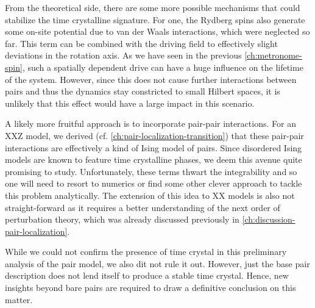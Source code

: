 From the theoretical side, there are some more possible mechanisms that could stabilize the time crystalline signature. For one, the Rydberg spins also generate some on-site potential due to van der Waals interactions, which were neglected so far. This term can be combined with the driving field to effectively slight deviations in the rotation axis. As we have seen in the previous \autoref{ch:metronome-spin}, such a spatially dependent drive can have a huge influence on the lifetime of the system. However, since this does not cause further interactions between pairs and thus the dynamics stay constricted to small Hilbert spaces, it is unlikely that this effect would have a large impact in this scenario.

A likely more fruitful approach is to incorporate pair-pair interactions. For an XXZ model, we derived (cf. \autoref{ch:pair-localization-transition}) that these pair-pair interactions are effectively a kind of Ising model of pairs. Since disordered Ising models are known to feature time crystalline phases, we deem this avenue quite promising to study. Unfortunately, these terms thwart the integrability and so one will need to resort to numerics or find some other clever approach to tackle this problem analytically.
The extension of this idea to XX models is also not straight-forward as it requires a better understanding of the next order of perturbation theory, which was already discussed previously in \autoref{ch:discussion-pair-localization}.

While we could not confirm the presence of time crystal in this preliminary analysis of the pair model, we also dit not rule it out. However, just the base pair description does not lend itself to produce a stable time crystal. Hence, new insights beyond bare pairs are required to draw a definitive conclusion on this matter.

